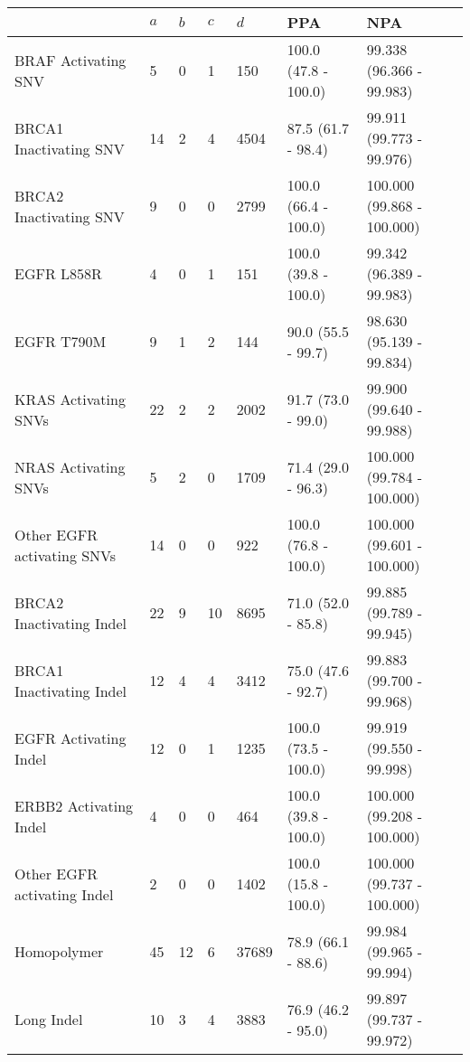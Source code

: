 \begin{tabular}{|l|l|l|l|l|l|l|}
\hline
\rowcolor[gray]{.85}{}                           & \textbf{$a$} & \textbf{$b$} & \textbf{$c$} & \textbf{$d$} & \textbf{PPA} & \textbf{                         NPA }\\ \hline
BRAF Activating SNV         &    5 &    0 &    1 &    150 &  100.0 (47.8 - 100.0) &    99.338 (96.366 - 99.983) \\ \hline
BRCA1 Inactivating SNV      &   14 &    2 &    4 &   4504 &    87.5 (61.7 - 98.4) &    99.911 (99.773 - 99.976) \\ \hline
BRCA2 Inactivating SNV      &    9 &    0 &    0 &   2799 &  100.0 (66.4 - 100.0) &  100.000 (99.868 - 100.000) \\ \hline
EGFR L858R                  &    4 &    0 &    1 &    151 &  100.0 (39.8 - 100.0) &    99.342 (96.389 - 99.983) \\ \hline
EGFR T790M                  &    9 &    1 &    2 &    144 &    90.0 (55.5 - 99.7) &    98.630 (95.139 - 99.834) \\ \hline
KRAS Activating SNVs        &   22 &    2 &    2 &   2002 &    91.7 (73.0 - 99.0) &    99.900 (99.640 - 99.988) \\ \hline
NRAS Activating SNVs        &    5 &    2 &    0 &   1709 &    71.4 (29.0 - 96.3) &  100.000 (99.784 - 100.000) \\ \hline
Other EGFR activating SNVs  &   14 &    0 &    0 &    922 &  100.0 (76.8 - 100.0) &  100.000 (99.601 - 100.000) \\ \hline
BRCA2 Inactivating Indel    &   22 &    9 &   10 &   8695 &    71.0 (52.0 - 85.8) &    99.885 (99.789 - 99.945) \\ \hline
BRCA1 Inactivating Indel    &   12 &    4 &    4 &   3412 &    75.0 (47.6 - 92.7) &    99.883 (99.700 - 99.968) \\ \hline
EGFR Activating Indel       &   12 &    0 &    1 &   1235 &  100.0 (73.5 - 100.0) &    99.919 (99.550 - 99.998) \\ \hline
ERBB2 Activating Indel      &    4 &    0 &    0 &    464 &  100.0 (39.8 - 100.0) &  100.000 (99.208 - 100.000) \\ \hline
Other EGFR activating Indel &    2 &    0 &    0 &   1402 &  100.0 (15.8 - 100.0) &  100.000 (99.737 - 100.000) \\ \hline
Homopolymer                 &   45 &   12 &    6 &  37689 &    78.9 (66.1 - 88.6) &    99.984 (99.965 - 99.994) \\ \hline
Long Indel                  &   10 &    3 &    4 &   3883 &    76.9 (46.2 - 95.0) &    99.897 (99.737 - 99.972) \\ \hline

\end{tabular}
